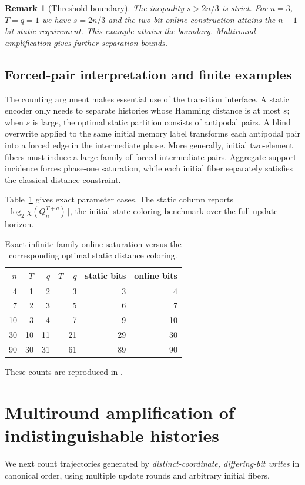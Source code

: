 \documentclass[11pt,a4paper]{article}
\newtheorem{remark}[theorem]{Remark}
\begin{document}
\begin{remark}[Threshold boundary]
The inequality $s>2n/3$ is strict. For $n=3$, $T=q=1$ we have $s=2n/3$ and the two-bit online construction attains the $n-1$-bit static requirement. This example attains the boundary. Multiround amplification gives further separation bounds.
\end{remark}

\subsection{Forced-pair interpretation and finite examples}
The counting argument makes essential use of the transition interface. A static encoder only needs to separate histories whose Hamming distance is at most $s$; when $s$ is large, the optimal static partition consists of antipodal pairs. A blind overwrite applied to the same initial memory label transforms each antipodal pair into a forced edge in the intermediate phase. More generally, initial two-element fibers must induce a large family of forced intermediate pairs. Aggregate support incidence forces phase-one saturation, while each initial fiber separately satisfies the classical distance constraint.

Table~\ref{tab:saturation} gives exact parameter cases. The static column reports $\lceil\log_2\chi(Q_n^{T+q})\rceil$, the initial-state coloring benchmark over the full update horizon.
\begin{table}[ht]
\centering
\begin{tabular}{@{}rrrrrr@{}}\toprule
$n$ & $T$ & $q$ & $T+q$ & static bits & online bits\\\midrule
4&1&2&3&3&4\\
7&2&3&5&6&7\\
10&3&4&7&9&10\\
30&10&11&21&29&30\\
90&30&31&61&89&90\\
\bottomrule\end{tabular}
\caption{Exact infinite-family online saturation versus the corresponding optimal static distance coloring.}\label{tab:saturation}
\end{table}

These counts are reproduced in .

\section{Multiround amplification of indistinguishable histories}\label{sec:amplification}
We next count trajectories generated by \emph{distinct-coordinate, differing-bit writes} in canonical order, using multiple update rounds and arbitrary initial fibers.
\end{document}
